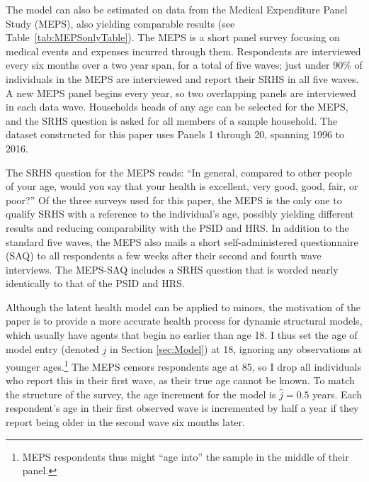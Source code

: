 \documentclass[12pt,pdftex,letterpaper]{article}
\newcommand{\Age}{j}
\newcommand{\AgeMin}{\underline{\Age}}
\newcommand{\AgeIncr}{\hat{\Age}}
\newcommand{\RootDir}{..}
\newcommand{\TablesDir}{\RootDir/Tables}
\begin{document}






The model can also be estimated on data from the Medical Expenditure Panel Study (MEPS), also yielding comparable results (see Table~\ref{tab:MEPSonlyTable}). The MEPS is a short panel survey focusing on medical events and expenses incurred through them.  Respondents are interviewed every six months over a two year span, for a total of five waves; just under 90\% of individuals in the MEPS are interviewed and report their SRHS in all five waves.  A new MEPS panel begins every year, so two overlapping panels are interviewed in each data wave.  Households heads of any age can be selected for the MEPS, and the SRHS question is asked for all members of a sample household.  The dataset constructed for this paper uses Panels 1 through 20, spanning 1996 to 2016.

The SRHS question for the MEPS reads: ``In general, compared to other people of your age, would you say that your health is excellent, very good, good, fair, or poor?''  Of the three surveys used for this paper, the MEPS is the only one to qualify SRHS with a reference to the individual's age, possibly yielding different results and reducing comparability with the PSID and HRS.  In addition to the standard five waves, the MEPS also mails a short self-administered questionnaire (SAQ) to all respondents a few weeks after their second and fourth wave interviews. The MEPS-SAQ includes a SRHS question that is worded nearly identically to that of the PSID and HRS.

Although the latent health model can be applied to minors, the motivation of the paper is to provide a more accurate health process for dynamic structural models, which usually have agents that begin no earlier than age 18.  I thus set the age of model entry (denoted $\AgeMin$ in Section \ref{sec:Model}) at 18, ignoring any observations at younger ages.\footnote{MEPS respondents thus might ``age into'' the sample in the middle of their panel.}  The MEPS censors respondents age at 85, so I drop all individuals who report this in their first wave, as their true age cannot be known.  To match the structure of the survey, the age increment for the model is $\AgeIncr=0.5$ years.  Each respondent's age in their first observed wave is incremented by half a year if they report being older in the second wave six months later.
\end{document}
